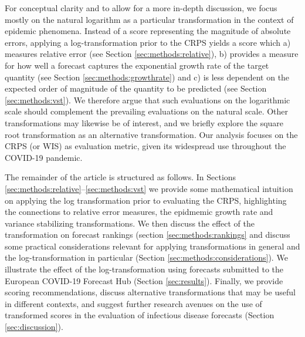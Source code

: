 \documentclass{article}
\begin{document}
For conceptual clarity and to allow for a more in-depth discussion, we focus mostly on the natural logarithm as a particular transformation in the context of epidemic phenomena. Instead of a score representing the magnitude of absolute errors, applying a log-transformation prior to the CRPS yields a score which a) measures relative error (see Section \ref{sec:methods:relative}), b) provides a measure for how well a forecast captures the exponential growth rate of the target quantity (see Section \ref{sec:methods:growthrate}) and c) is less dependent on the expected order of magnitude of the quantity to be predicted (see Section \ref{sec:methods:vst}). %
We therefore argue that such evaluations on the logarithmic scale should complement the prevailing evaluations on the natural scale. 
Other transformations may likewise be of interest, and we briefly explore the square root transformation as an alternative transformation. %
Our analysis focuses on the CRPS (or WIS) as evaluation metric, given its widespread use throughout the COVID-19 pandemic. 

The remainder of the article is structured as follows. In Sections \ref{sec:methods:relative}--\ref{sec:methods:vst} we provide some mathematical intuition on applying the log transformation prior to evaluating the CRPS, highlighting the connections to relative error measures, the epidmemic growth rate and variance stabilizing transformations.
We then discuss the effect of the transformation on forecast rankings (section \ref{sec:methods:rankings} and discuss some practical considerations relevant for applying transformations in general and the log-transformation in particular (Section \ref{sec:methods:considerations}). We illustrate the effect of the log-transformation using forecasts submitted to the European COVID-19 Forecast Hub  \citep{europeancovid-19forecasthubEuropeanCovid19Forecast2021, sherrattPredictivePerformanceMultimodel2022} (Section \ref{sec:results}). Finally, we provide scoring recommendations, discuss alternative transformations that may be useful in different contexts, and suggest further research avenues on the use of transformed scores in the evaluation of infectious disease forecasts (Section \ref{sec:discussion}). 
\end{document}
